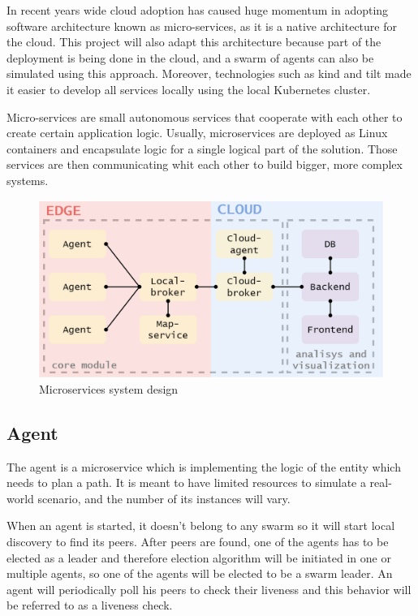 In recent years wide cloud adoption has caused huge momentum in adopting software architecture known as micro-services, as it is a native architecture for the cloud. This project will also adapt this architecture because part of the deployment is being done in the cloud, and a swarm of agents can also be simulated using this approach. Moreover, technologies such as kind and tilt made it easier to develop all services locally using the local Kubernetes cluster.

Micro-services are small autonomous services that cooperate with each other to create certain application logic\cite{building_microservices}. Usually, microservices are deployed as Linux containers and encapsulate logic for a single logical part of the solution. Those services are then communicating whit each other to build bigger, more complex systems.

\begin{figure}[H]
    \centering
    \includegraphics[width=\textwidth]{pictures/services.png}
    \caption{ Microservices system design }
    \label{fig:micro_services}
\end{figure}

\subsection{Agent}
The agent is a microservice which is implementing the logic of the entity which needs to plan a path.  It is meant to have limited resources to simulate a real-world scenario, and the number of its instances will vary.

When an agent is started, it doesn't belong to any swarm so it will start local discovery to find its peers. After peers are found, one of the agents has to be elected as a leader and therefore election algorithm will be initiated in one or multiple agents, so one of the agents will be elected to be a swarm leader. An agent will periodically poll his peers to check their liveness and this behavior will be referred to as a liveness check.

